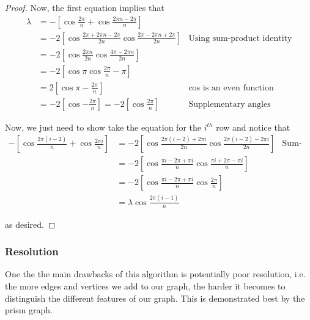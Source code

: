 \documentclass[11pt]{article}
\begin{document}
\begin{proof}
    Now, the first equation implies that 
    \[\begin{aligned}
        \lambda
        &= -\left[
            \cos{\frac{2\pi}{n}} + \cos{\frac{2\pi n - 2\pi}{n}}   
            \right] \\
        &= -2\left[
            \cos{ \frac{
                2 \pi + 2\pi n - 2\pi    
            }{ 2n } }
            \cos{ \frac{
                2\pi - 2\pi n + 2\pi
                }{ 2n }
            } \right]
        &\text{Using sum-product identity} \\
        &= -2\left[
            \cos{ \frac{2 \pi n}{2n} } \cos{\frac{ 4\pi - 2\pi n }{2n} }
        \right] \\
        &= -2\left[
            \cos{ \pi } \cos{ \frac{ 2\pi}{n} - \pi }
        \right] \\
        &= 2\left[
        \cos{ \pi - \frac{ 2\pi}{n}} \right]
        &\text{cos is an even function} \\
        &= -2\left[ \cos{ - \frac{ 2\pi}{n}} \right]
        = -2\left[ \cos{ \frac{ 2\pi}{n}} \right]
        &\text{Supplementary angles}
   \end{aligned}\]
   
   Now, we just need to show take the equation for the $i^{th}$ row and notice that
   \[
   \begin{aligned}
        -\left[\cos{\frac{2 \pi (i - 2)}{n}} + \cos{\frac{2 \pi i}{n}}\right]
        &= -2\left[
            \cos{ \frac{2\pi(i - 2) + 2\pi i}{2n} }
            \cos{ \frac{2\pi(i - 2) - 2\pi i}{2n} }
        \right]
        &\text{Sum-product identity} \\
        &= -2\left[
            \cos{ \frac{\pi i - 2\pi + \pi i}{n} }
            \cos{ \frac{\pi i + 2\pi - \pi i}{n} }
        \right] \\
        &= -2\left[
            \cos{ \frac{\pi i - 2\pi + \pi i}{n} }
            \cos{ \frac{2\pi}{n} }
        \right] \\
        &= \lambda \cos{ \frac{2\pi(i - 1)}{n} }
   \end{aligned}
   \]
   
   as desired.
    
\end{proof}

\subsubsection{Resolution}
One the the main drawbacks of this algorithm is potentially poor resolution, i.e. the more edges and vertices we add to our graph, the harder it becomes to distinguish the different features of our graph. This is demonstrated best by the prism graph.
\end{document}
